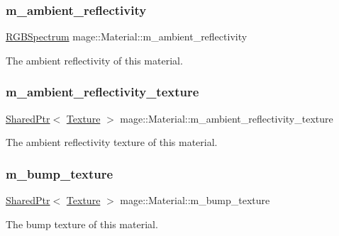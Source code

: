\subsubsection{\texorpdfstring{m\+\_\+ambient\+\_\+reflectivity}{m\_ambient\_reflectivity}}
{\footnotesize\ttfamily \hyperlink{structmage_1_1_r_g_b_spectrum}{R\+G\+B\+Spectrum} mage\+::\+Material\+::m\+\_\+ambient\+\_\+reflectivity}

The ambient reflectivity of this material. \hypertarget{structmage_1_1_material_a72a90b9d339d705b5fd46098df5892e2}{}\label{structmage_1_1_material_a72a90b9d339d705b5fd46098df5892e2} 
\subsubsection{\texorpdfstring{m\+\_\+ambient\+\_\+reflectivity\+\_\+texture}{m\_ambient\_reflectivity\_texture}}
{\footnotesize\ttfamily \hyperlink{namespacemage_a1e01ae66713838a7a67d30e44c67703e}{Shared\+Ptr}$<$ \hyperlink{classmage_1_1_texture}{Texture} $>$ mage\+::\+Material\+::m\+\_\+ambient\+\_\+reflectivity\+\_\+texture}

The ambient reflectivity texture of this material. \hypertarget{structmage_1_1_material_aa69355550fbcf2230442e53d71d4ebc6}{}\label{structmage_1_1_material_aa69355550fbcf2230442e53d71d4ebc6} 
\subsubsection{\texorpdfstring{m\+\_\+bump\+\_\+texture}{m\_bump\_texture}}
{\footnotesize\ttfamily \hyperlink{namespacemage_a1e01ae66713838a7a67d30e44c67703e}{Shared\+Ptr}$<$ \hyperlink{classmage_1_1_texture}{Texture} $>$ mage\+::\+Material\+::m\+\_\+bump\+\_\+texture}

The bump texture of this material. \hypertarget{structmage_1_1_material_acdab45e5d78ddbb7f717d9db67ff3fcf}{}\label{structmage_1_1_material_acdab45e5d78ddbb7f717d9db67ff3fcf} 
